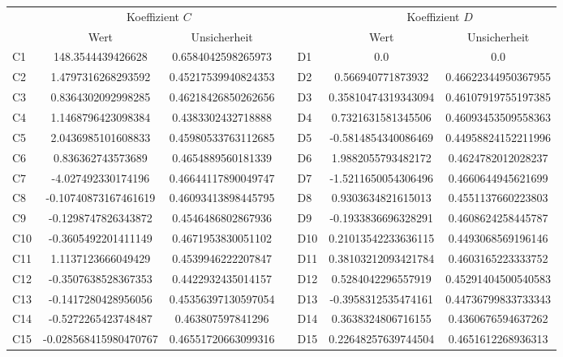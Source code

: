 \documentclass[ngerman,ruledheaders=section,class=report,thesis={type=Protokoll},accentcolor=1b,marginpar=false,parskip=half-,fontsize=11pt,]{tudapub}
\begin{document}
\begin{table}[ht]
    \centering
    \begin{tabular}{lccclcc}
        \toprule
        & \multicolumn{2}{c}{Koeffizient \( C \)} & & & \multicolumn{2}{c}{Koeffizient \( D \)} \\
        \cmidrule{2-3} \cmidrule{6-7}
        & Wert & Unsicherheit & & & Wert & Unsicherheit \\
        \midrule
        C1 & 148.3544439426628 & 0.6584042598265973 & & D1 & 0.0 & 0.0 \\
        C2 & 1.4797316268293592 & 0.45217539940824353 & & D2 & 0.566940771873932 & 0.46622344950367955 \\
        C3 & 0.8364302092998285 & 0.46218426850262656 & & D3 & 0.35810474319343094 & 0.46107919755197385 \\
        C4 & 1.1468796423098384 & 0.4383302432718888 & & D4 & 0.7321631581345506 & 0.46093453509558363 \\
        C5 & 2.0436985101608833 & 0.45980533763112685 & & D5 & -0.5814854340086469 & 0.44958824152211996 \\
        C6 & 0.836362743573689 & 0.4654889560181339 & & D6 & 1.9882055793482172 & 0.4624782012028237 \\
        C7 & -4.027492330174196 & 0.46644117890049747 & & D7 & -1.5211650054306496 & 0.4660644945621699 \\
        C8 & -0.10740873167461619 & 0.46093413898445795 & & D8 & 0.9303634821615013 & 0.4551137660223803 \\
        C9 & -0.1298747826343872 & 0.4546486802867936 & & D9 & -0.1933836696328291 & 0.4608624258445787 \\
        C10 & -0.3605492201411149 & 0.4671953830051102 & & D10 & 0.21013542233636115 & 0.4493068569196146 \\
        C11 & 1.1137123666049429 & 0.4539946222207847 & & D11 & 0.38103212093421784 & 0.4603165223333752 \\
        C12 & -0.3507638528367353 & 0.4422932435014157 & & D12 & 0.5284042296557919 & 0.45291404500540583 \\
        C13 & -0.1417280428956056 & 0.45356397130597054 & & D13 & -0.3958312535474161 & 0.44736799833733343 \\
        C14 & -0.5272265423748487 & 0.463807597841296 & & D14 & 0.3638324806716155 & 0.4360676594637262 \\
        C15 & -0.028568415980470767 & 0.46551720663099316 & & D15 & 0.22648257639744504 & 0.4651612268936313 \\

\end{tabular}
\end{table}
\end{document}
